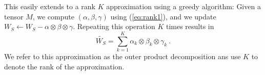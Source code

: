This easily extends to a rank $K$ approximation using a greedy algorithm: Given a 
tensor $M$, we compute $(\alpha, \beta, \gamma)$ using (\ref{eq:rank1}), and we update 
$W_S \leftarrow W_S - \alpha \otimes \beta \otimes \gamma$. Repeating this operation $K$
times results in 
\begin{equation}
\label{eq:rankK}
	\tilde{W_S} = \sum_{k = 1}^{K} \alpha_k \otimes \beta_k \otimes \gamma_k ~.
\end{equation} 
We refer to this approximation as the outer product decomposition ans use $K$ to denote the rank of the approximation.

%


